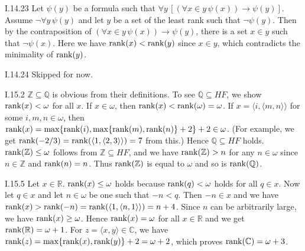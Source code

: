 \documentclass[12pt]{article}
\begin{document}
\begin{customthm}{I.14.23}
  Let $\psi(y)$ be a formula such that $\forall y\,[(\forall x\in y\,\psi(x))\rightarrow\psi(y)]$. Assume $\neg\forall y\,\psi(y)$ and let $y$ be a set of the least rank such that $\neg\psi(y)$. Then by the contraposition of $(\forall x\in y\,\psi(x))\rightarrow\psi(y)$, there is a set $x\in y$ such that $\neg\psi(x)$. Here we have $\mathop{\mathrm{rank}}(x)<\mathop{\mathrm{rank}}(y)$ since $x\in y$, which contradicts the minimality of $\mathop{\mathrm{rank}}(y)$.
\end{customthm}

\begin{customthm}{I.14.24}
  Skipped for now.
\end{customthm}

\begin{customthm}{I.15.2}
  $\mathbb{Z}\subseteq\mathbb{Q}$ is obvious from their definitions. To see $\mathbb{Q}\subseteq HF$, we show $\mathop{\mathrm{rank}}(x)<\omega$ for all $x$. If $x\in\omega$, then $\mathop{\mathrm{rank}}(x)<\mathop{\mathrm{rank}}(\omega)=\omega$. If $x=\langle i,\langle m,n\rangle\rangle$ for some $i,m,n\in\omega$, then $\mathop{\mathrm{rank}}(x)=\max\{\mathop{\mathrm{rank}}(i),\max\{\mathop{\mathrm{rank}}(m),\mathop{\mathrm{rank}}(n)\}+2\}+2\in\omega$. (For example, we get $\mathop{\mathrm{rank}}(-2/3)=\mathop{\mathrm{rank}}(\langle 1,\langle 2,3\rangle\rangle)=7$ from this.) Hence $\mathbb{Q}\subseteq HF$ holds. $\mathop{\mathrm{rank}}(\mathbb{Z})\leq\omega$ follows from $\mathbb{Z}\subseteq HF$, and we have $\mathop{\mathrm{rank}}(\mathbb{Z})>n$ for any $n\in\omega$ since $n\in\mathbb{Z}$ and $\mathop{\mathrm{rank}}(n)=n$. Thus $\mathop{\mathrm{rank}}(\mathbb{Z})$ is equal to $\omega$ and so is $\mathop{\mathrm{rank}}(\mathbb{Q})$.
\end{customthm}

\begin{customthm}{I.15.5}
  Let $x\in\mathbb{R}$. $\mathop{\mathrm{rank}}(x)\leq\omega$ holds because $\mathop{\mathrm{rank}}(q)<\omega$ holds for all $q\in x$. Now let $q\in x$ and let $n\in\omega$ be one such that $-n<q$. Then $-n\in x$ and we have $\mathop{\mathrm{rank}}(x)>\mathop{\mathrm{rank}}(-n)=\mathop{\mathrm{rank}}(\langle 1,\langle n,1\rangle\rangle)=n+4$. Since $n$ can be arbitrarily large, we have $\mathop{\mathrm{rank}}(x)\geq\omega$. Hence $\mathop{\mathrm{rank}}(x)=\omega$ for all $x\in\mathbb{R}$ and we get $\mathop{\mathrm{rank}}(\mathbb{R})=\omega+1$. For $z=\langle x,y\rangle\in\mathbb{C}$, we have $\mathop{\mathrm{rank}}(z)=\max\{\mathop{\mathrm{rank}}(x),\mathop{\mathrm{rank}}(y)\}+2=\omega+2$, which proves $\mathop{\mathrm{rank}}(\mathbb{C})=\omega+3$.
\end{customthm}
\end{document}
